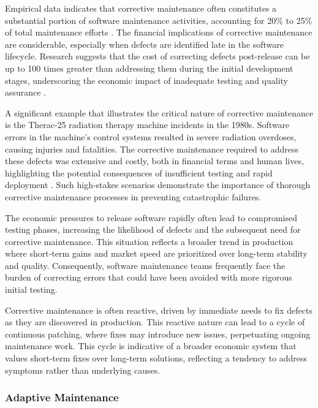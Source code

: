 \begin{refsection}
Empirical data indicates that corrective maintenance often constitutes a substantial portion of software maintenance activities, accounting for 20\% to 25\% of total maintenance efforts \cite[pp.~97-99]{pigoski2008practical}. The financial implications of corrective maintenance are considerable, especially when defects are identified late in the software lifecycle. Research suggests that the cost of correcting defects post-release can be up to 100 times greater than addressing them during the initial development stages, underscoring the economic impact of inadequate testing and quality assurance \cite[pp.~153-155]{boehm1981software}.

A significant example that illustrates the critical nature of corrective maintenance is the Therac-25 radiation therapy machine incidents in the 1980s. Software errors in the machine’s control systems resulted in severe radiation overdoses, causing injuries and fatalities. The corrective maintenance required to address these defects was extensive and costly, both in financial terms and human lives, highlighting the potential consequences of insufficient testing and rapid deployment \cite[pp.~6-8]{leveson1993therac}. Such high-stakes scenarios demonstrate the importance of thorough corrective maintenance processes in preventing catastrophic failures.

The economic pressures to release software rapidly often lead to compromised testing phases, increasing the likelihood of defects and the subsequent need for corrective maintenance. This situation reflects a broader trend in production where short-term gains and market speed are prioritized over long-term stability and quality. Consequently, software maintenance teams frequently face the burden of correcting errors that could have been avoided with more rigorous initial testing.

Corrective maintenance is often reactive, driven by immediate needs to fix defects as they are discovered in production. This reactive nature can lead to a cycle of continuous patching, where fixes may introduce new issues, perpetuating ongoing maintenance work. This cycle is indicative of a broader economic system that values short-term fixes over long-term solutions, reflecting a tendency to address symptoms rather than underlying causes.

\subsubsection{Adaptive Maintenance}


\end{refsection}
